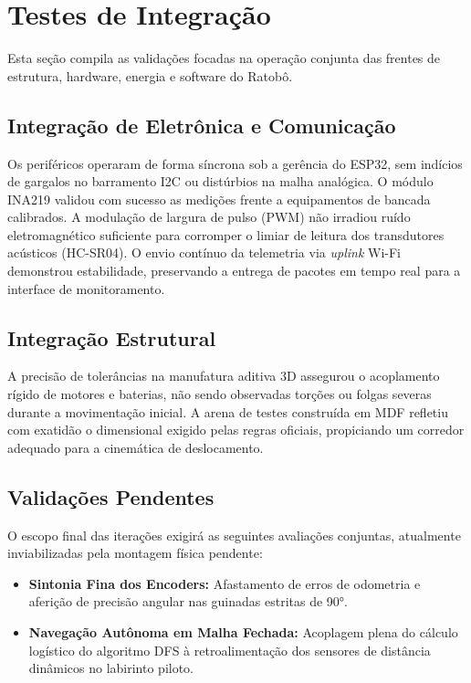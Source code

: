 \section{Testes de Integração}

Esta seção compila as validações focadas na operação conjunta das frentes de estrutura, hardware, energia e software do Ratobô.

\subsection{Integração de Eletrônica e Comunicação}
Os periféricos operaram de forma síncrona sob a gerência do ESP32, sem indícios de gargalos no barramento I2C ou distúrbios na malha analógica. O módulo INA219 validou com sucesso as medições frente a equipamentos de bancada calibrados. A modulação de largura de pulso (PWM) não irradiou ruído eletromagnético suficiente para corromper o limiar de leitura dos transdutores acústicos (HC-SR04). O envio contínuo da telemetria via \textit{uplink} Wi-Fi demonstrou estabilidade, preservando a entrega de pacotes em tempo real para a interface de monitoramento.

\subsection{Integração Estrutural}
A precisão de tolerâncias na manufatura aditiva 3D assegurou o acoplamento rígido de motores e baterias, não sendo observadas torções ou folgas severas durante a movimentação inicial. A arena de testes construída em MDF refletiu com exatidão o dimensional exigido pelas regras oficiais, propiciando um corredor adequado para a cinemática de deslocamento.

\subsection{Validações Pendentes}
O escopo final das iterações exigirá as seguintes avaliações conjuntas, atualmente inviabilizadas pela montagem física pendente:
\begin{itemize}
    \item \textbf{Sintonia Fina dos Encoders:} Afastamento de erros de odometria e aferição de precisão angular nas guinadas estritas de 90°.
    \item \textbf{Navegação Autônoma em Malha Fechada:} Acoplagem plena do cálculo logístico do algoritmo DFS à retroalimentação dos sensores de distância dinâmicos no labirinto piloto.
\end{itemize}